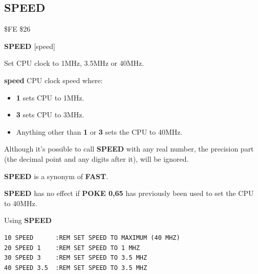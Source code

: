 \subsection{SPEED}
\begin{description}[leftmargin=2cm,style=nextline]
\item [Token:] \$FE \$26
\item [Format:] {\bf SPEED} [speed]
\item [Usage:] Set CPU clock to 1MHz, 3.5MHz or 40MHz.

               {\bf speed} CPU clock speed where:
               \begin{itemize}
                   \item {\bf 1} sets CPU to 1MHz.
                   \item {\bf 3} sets CPU to 3MHz.
                   \item Anything other than {\bf 1} or {\bf 3} sets the CPU to 40MHz.
               \end{itemize}
\item [Remarks:] Although it's possible to call {\bf SPEED}
                 with any real number, the precision part (the decimal point
                 and any digits after it), will be ignored.

                {\bf SPEED} is a synonym of {\bf FAST}.

                {\bf SPEED} has no effect if {\bf POKE 0,65}
                has previously been used to set the CPU to 40MHz.

\item [Example:] Using {\bf SPEED}
\begin{tcolorbox}[colback=black,coltext=white]
\verbatimfont{\codefont}
\begin{verbatim}
10 SPEED      :REM SET SPEED TO MAXIMUM (40 MHZ)
20 SPEED 1    :REM SET SPEED TO 1 MHZ
30 SPEED 3    :REM SET SPEED TO 3.5 MHZ
40 SPEED 3.5  :REM SET SPEED TO 3.5 MHZ
\end{verbatim}
\end{tcolorbox}
\end{description}


\newpage
